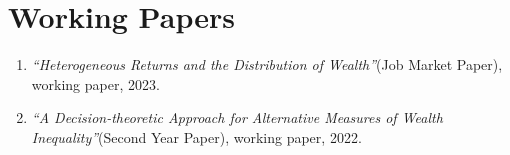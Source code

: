 
\section{Working Papers}
\vspace{-.25in}
\begin{enumerate}
	\item  \textit{``Heterogeneous Returns and the Distribution of Wealth''}(Job Market Paper), working paper, 2023.
	
	\item \textit{``A Decision-theoretic Approach for Alternative Measures of Wealth Inequality''}(Second Year Paper), working paper, 2022.


	
\end{enumerate}   

